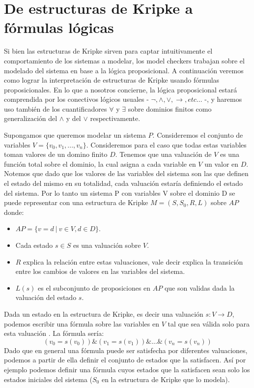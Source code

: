 \documentclass[pdftex,a4paper,12pt]{book}
\begin{document}



\section{De estructuras de Kripke a f\'ormulas l\'ogicas}


Si bien las estructuras de Kripke sirven para captar intuitivamente el comportamiento de los sistemas a modelar, los model checkers trabajan sobre el modelado del sistema en base a la l\'ogica proposicional. A continuaci\'on veremos como lograr la interpretaci\'on de estructuras de Kripke usando f\'ormulas proposicionales. En lo que a nosotros concierne, la l\'ogica proposicional estar\'a comprendida por los conectivos l\'ogicos usuales - $\neg,\wedge,\vee,\rightarrow,etc...$ -, y haremos uso tambi\'en de los cuantificadores $\forall$ y $\exists$ sobre dominios finitos como generalizaci\'on del $\wedge$ y del $\vee$ respectivamente.

Supongamos que queremos modelar un sistema $P$. Consideremos el conjunto de variables $V = \lbrace v_0,v_1,...,v_n \rbrace$. Consideremos para el caso que todas estas variables toman valores de un domino finito $D$. Tenemos que una valuaci\'on de $V$ es una funci\'on total sobre el dominio, la cual asigna a cada variable en $V$ un valor en $D$. Notemos que dado que los valores de las variables del sistema son las que definen el estado del mismo en su totalidad, cada valuaci\'on estar\'ia definiendo el estado del sistema. Por lo tanto un sistema P con variables V sobre el dominio D se puede representar con una estructura de Kripke $M = (S,S_0,R,L)$ sobre $AP$ donde:

\begin{itemize}
\item $AP = \{v=d~|~ v \in V, d \in D\}.$
\item Cada estado $s \in S$ es una valuaci\'on sobre $V$.
\item $R$ explica la relaci\'on entre estas valuaciones, vale decir explica la transici\'on entre los cambios de valores en las variables del sistema.
\item $L(s)$ es el subconjunto de proposiciones en $AP$ que son validas dada la valuaci\'on del estado $s$.
\end{itemize}

Dada un estado en la estructura de Kripke, es decir una valuaci\'on $s:V\rightarrow D$, podemos escribir una f\'ormula sobre las variables en $V$ tal que sea v\'alida solo para esta valuaci\'on \cite{Clarke}. La f\'ormula ser\'ia: $$(v_0 = s(v_0)) \& (v_1 = s(v_1)) \& ... \& (v_n = s(v_n))$$
Dado que en general una f\'ormula puede ser satisfecha por diferentes valuaciones, podemos a partir de ella definir el conjunto de estados que la satisfacen. As\'i por ejemplo podemos definir una f\'ormula cuyos estados que la satisfacen sean solo los estados iniciales del sistema ($S_0$ en la estructura de Kripke que lo modela).
\end{document}
